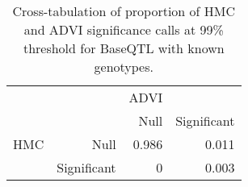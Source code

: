 \begin{table}[ht]
\centering
\begin{tabular}{rr|rr}
   &  & ADVI &  \\ 
    &   & Null & Significant \\ 
   \hline
HMC & Null & 0.986 & 0.011 \\ 
    & Significant & 0 & 0.003 \\ 
  \end{tabular}
\caption{Cross-tabulation of proportion of HMC and ADVI significance calls at 99\% threshold for BaseQTL with known genotypes.} 
\label{tab:gt-xtab-prop-99}
\end{table}
